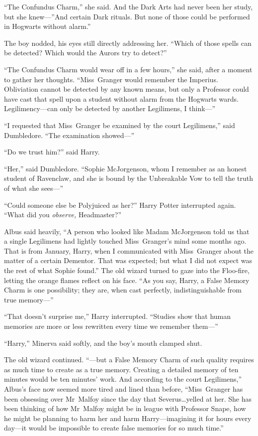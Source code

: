 “The Confundus Charm,” she said. And the Dark Arts had never been her study, but she knew—”And certain Dark rituals. But none of those could be performed in Hogwarts without alarm.”

The boy nodded, his eyes still directly addressing her. “Which of those spells can be detected? Which would the Aurors try to detect?”

“The Confundus Charm would wear off in a few hours,” she said, after a moment to gather her thoughts. “Miss~Granger would remember the Imperius. Obliviation cannot be detected by any known means, but only a Professor could have cast that spell upon a student without alarm from the Hogwarts wards. Legilimency—can only be detected by another Legilimens, I think—”

“I requested that Miss~Granger be examined by the court Legilimens,” said Dumbledore. “The examination showed—”

“Do we trust him?” said Harry.

“Her,” said Dumbledore. “Sophie McJorgenson, whom I remember as an honest student of Ravenclaw, and she is bound by the Unbreakable Vow to tell the truth of what she sees—”

“Could someone else be Polyjuiced as her?” Harry Potter interrupted again. “What did you \emph{observe,} Headmaster?”

Albus said heavily, “A person who looked like Madam McJorgenson told us that a single Legilimens had lightly touched Miss~Granger’s mind some months ago. That is from January, Harry, when I communicated with Miss~Granger about the matter of a certain Dementor. That was expected; but what I did not expect was the rest of what Sophie found.” The old wizard turned to gaze into the Floo-fire, letting the orange flames reflect on his face. “As you say, Harry, a False Memory Charm is one possibility; they are, when cast perfectly, indistinguishable from true memory—”

“That doesn’t surprise me,” Harry interrupted. “Studies show that human memories are more or less rewritten every time we remember them—”

“Harry,” Minerva said softly, and the boy’s mouth clamped shut.

The old wizard continued. “—but a False Memory Charm of such quality requires as much time to create as a true memory. Creating a detailed memory of ten minutes would be ten minutes’ work. And according to the court Legilimens,” Albus’s face now seemed more tired and lined than before, “Miss~Granger has been obsessing over Mr~Malfoy since the day that Severus…yelled at her. She has been thinking of how Mr~Malfoy might be in league with Professor Snape, how he might be planning to harm her and harm Harry—imagining it for hours every day—it would be impossible to create false memories for so much time.”


